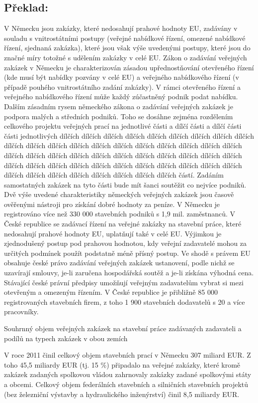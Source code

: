 \documentclass[10pt]{article}
\begin{document}
\pagebreak

\subsection*{Překlad:}

V Německu jsou zakázky, které nedosahují prahové hodnoty EU, zadávány v souladu s vnitrostátními postupy (veřejné nabídkové řízení, omezené nabídkové řízení, sjednaná zakázka), které jsou však výše uvedenými postupy, které jsou do značné míry totožné s udělením zakázky v celé EU.
Zákon o zadávání veřejných zakázek v Německu je charakterizován zásadou upřednostňování otevřeného řízení (kde musí být nabídky pozvány v celé EU) a veřejného nabídkového řízení (v případě pouhého vnitrostátního zadání zakázky).
V rámci otevřeného řízení a veřejného nabídkového řízení může každý zúčastněný podnik podat nabídku.
Dalším zásadním rysem německého zákona o zadávání veřejných zakázek je podpora malých a středních podniků.
Toho se dosáhne zejména rozdělením celkového projektu veřejných prací na jednotlivé části a dílčí části a dílčí části části jednotlivých dílčích dílčích dílčích dílčích dílčích dílčích dílčích dílčích dílčích dílčích dílčích dílčích dílčích dílčích dílčích dílčích dílčích dílčích dílčích dílčích dílčích dílčích dílčích dílčích dílčích dílčích dílčích dílčích dílčích dílčích dílčích dílčích dílčích dílčích dílčích dílčích dílčích dílčích dílčích dílčích dílčích dílčích dílčích dílčích dílčích dílčích dílčích dílčích dílčích dílčích částí.
Zadáním samostatných zakázek na tyto části bude mít šanci soutěžit co nejvíce podniků.
Dvě výše uvedené charakteristiky německých veřejných zakázek jsou časově ověřenými nástroji pro získání dobré hodnoty za peníze.
V Německu je registrováno více než 330 000 stavebních podniků s 1,9 mil. zaměstnanců.
V České republice se zadávací řízení na veřejné zakázky na stavební práce, které nedosahují prahové hodnoty EU, uplatňují také v celé EU.
Výjimkou je zjednodušený postup pod prahovou hodnotou, kdy veřejní zadavatelé mohou za určitých podmínek použít podstatně méně přísný postup.
Ve shodě s právem EU obsahuje české právo zadávání veřejných zakázek ustanovení, podle nichž se uzavírají smlouvy, je-li zaručena hospodářská soutěž a je-li získána výhodná cena.
Stávající české právní předpisy umožňují veřejným zadavatelům vybrat si mezi otevřeným a omezeným řízením.
V České republice je přibližně 85 000 registrovaných stavebních firem, z toho 1 900 stavebních dodavatelů s 20 a více pracovníky.


Souhrnný objem veřejných zakázek na stavební práce zadávaných zadavateli a podílů na typech zakázek v obou zemích

V roce 2011 činil celkový objem stavebních prací v Německu 307 miliard EUR.
Z toho 45,5 miliardy EUR (tj. 15 \%) připadalo na veřejné zakázky, které kromě zakázek zadaných spolkovou vládou zahrnovaly zakázky zadané spolkovými státy a obcemi.
Celkový objem federálních stavebních a silničních stavebních projektů (bez železniční výstavby a hydraulického inženýrství) činil 8,5 miliardy EUR.
\end{document}
